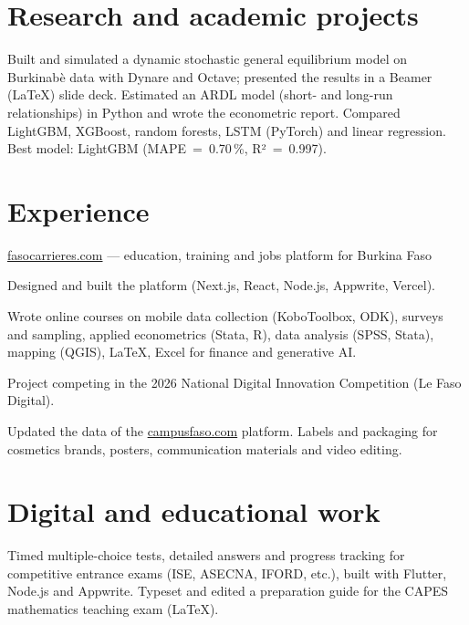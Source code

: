 \documentclass[10pt]{article}
\begin{document}
\section{Research and academic projects}
  {Built and simulated a dynamic stochastic general equilibrium model on Burkinabè data with Dynare and Octave;
   presented the results in a Beamer (\LaTeX) slide deck.}
  {Estimated an ARDL model (short- and long-run relationships) in Python and wrote the econometric report.}
  {Compared LightGBM, XGBoost, random forests, LSTM (PyTorch) and linear regression.
   Best model: LightGBM (MAPE~=~0.70\,\%, R²~=~0.997).}

\section{Experience}
  {\href{https://fasocarrieres.com}{fasocarrieres.com} — education, training and jobs platform for Burkina Faso}
  {\begin{cvlist}
     \item Designed and built the platform (Next.js, React, Node.js, Appwrite, Vercel).
     \item Wrote online courses on mobile data collection (KoboToolbox, ODK), surveys and sampling,
           applied econometrics (Stata, R), data analysis (SPSS, Stata), mapping (QGIS), \LaTeX{},
           Excel for finance and generative AI.
     \item Project competing in the 2026 National Digital Innovation Competition (Le Faso Digital).
   \end{cvlist}}
  {Updated the data of the \href{https://campusfaso.com}{campusfaso.com} platform.}
  {Labels and packaging for cosmetics brands, posters, communication materials and video editing.}

\section{Digital and educational work}
  {Timed multiple-choice tests, detailed answers and progress tracking for competitive entrance exams
   (ISE, ASECNA, IFORD, etc.), built with Flutter, Node.js and Appwrite.}
  {Typeset and edited a preparation guide for the CAPES mathematics teaching exam (\LaTeX).}
\end{document}

